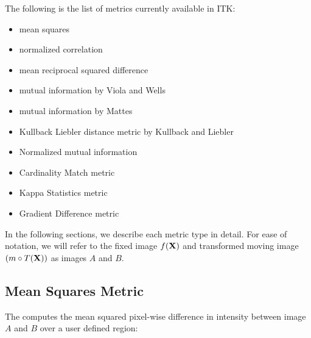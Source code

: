 The following is the list of metrics currently available in ITK:
\begin{itemize}
\item mean squares\\ 
\item normalized correlation \\ 
\item mean reciprocal squared difference \\  
\item mutual information by Viola and Wells \\ 
\item mutual information by Mattes \\ 
\item Kullback Liebler distance metric by Kullback and Liebler \\ 
\item Normalized mutual information \\ 
\item Cardinality Match metric \\ 
\item Kappa Statistics metric\\ 
\item Gradient Difference metric \\ 
\end{itemize}

In the following sections, we describe each metric type in detail. 
For ease of notation, we will refer to the fixed image $f(\bf{X})$ 
and transformed moving image $(m \circ T(\bf{X}))$ as images $A$ and $B$.

\subsection{Mean Squares Metric}
\label{sec:MeanSquaresMetric}

The  computes the mean squared
pixel-wise difference in intensity between image $A$ and $B$ over a user
defined region:

